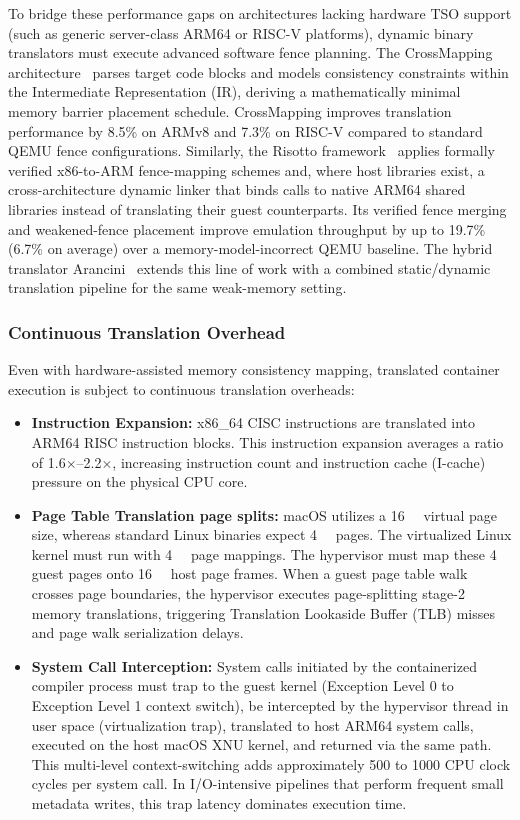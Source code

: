 To bridge these performance gaps on architectures lacking hardware TSO support (such as generic server-class ARM64 or RISC-V platforms), dynamic binary translators must execute advanced software fence planning. The CrossMapping architecture~\cite{Gao2024CrossMapping} parses target code blocks and models consistency constraints within the Intermediate Representation (IR), deriving a mathematically minimal memory barrier placement schedule. CrossMapping improves translation performance by 8.5\% on ARMv8 and 7.3\% on RISC-V compared to standard QEMU fence configurations. Similarly, the Risotto framework~\cite{Gouicem2023Risotto} applies formally verified x86-to-ARM fence-mapping schemes and, where host libraries exist, a cross-architecture dynamic linker that binds calls to native ARM64 shared libraries instead of translating their guest counterparts. Its verified fence merging and weakened-fence placement improve emulation throughput by up to 19.7\% (6.7\% on average) over a memory-model-incorrect QEMU baseline. The hybrid translator Arancini~\cite{Reimers2026Arancini} extends this line of work with a combined static/dynamic translation pipeline for the same weak-memory setting.

\subsubsection{Continuous Translation Overhead}
Even with hardware-assisted memory consistency mapping, translated container execution is subject to continuous translation overheads:
\begin{itemize}
    \item \textbf{Instruction Expansion:} x86\_64 CISC instructions are translated into ARM64 RISC instruction blocks. This instruction expansion averages a ratio of \num{1.6}$\times$--\num{2.2}$\times$, increasing instruction count and instruction cache (I-cache) pressure on the physical CPU core.
    \item \textbf{Page Table Translation page splits:} macOS utilizes a \SI{16}{\kilo\byte} virtual page size, whereas standard Linux binaries expect \SI{4}{\kilo\byte} pages. The virtualized Linux kernel must run with \SI{4}{\kilo\byte} page mappings. The hypervisor must map these \SI{4}{\kilo\byte} guest pages onto \SI{16}{\kilo\byte} host page frames. When a guest page table walk crosses page boundaries, the hypervisor executes page-splitting stage-2 memory translations, triggering Translation Lookaside Buffer (TLB) misses and page walk serialization delays.
    \item \textbf{System Call Interception:} System calls initiated by the containerized compiler process must trap to the guest kernel (Exception Level 0 to Exception Level 1 context switch), be intercepted by the hypervisor thread in user space (virtualization trap), translated to host ARM64 system calls, executed on the host macOS XNU kernel, and returned via the same path. This multi-level context-switching adds approximately \num{500} to \num{1000} CPU clock cycles per system call. In I/O-intensive pipelines that perform frequent small metadata writes, this trap latency dominates execution time.
\end{itemize}

